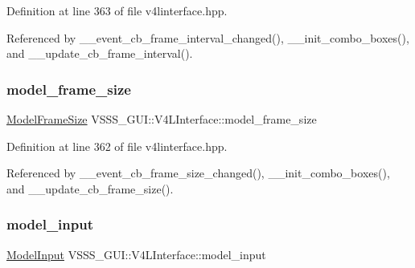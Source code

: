 Definition at line 363 of file v4linterface.\+hpp.



Referenced by \+\_\+\+\_\+event\+\_\+cb\+\_\+frame\+\_\+interval\+\_\+changed(), \+\_\+\+\_\+init\+\_\+combo\+\_\+boxes(), and \+\_\+\+\_\+update\+\_\+cb\+\_\+frame\+\_\+interval().

\mbox{\label{class_v_s_s_s___g_u_i_1_1_v4_l_interface_a04efec56b83f5abf62316fd79ee5ef22}} 
\subsubsection{\texorpdfstring{model\+\_\+frame\+\_\+size}{model\_frame\_size}}
{\footnotesize\ttfamily \hyperlink{class_v_s_s_s___g_u_i_1_1_v4_l_interface_adce6707a83ac1b5cd9dc7ee8b2929475}{Model\+Frame\+Size} V\+S\+S\+S\+\_\+\+G\+U\+I\+::\+V4\+L\+Interface\+::model\+\_\+frame\+\_\+size\hspace{0.3cm}{\ttfamily [private]}}



Definition at line 362 of file v4linterface.\+hpp.



Referenced by \+\_\+\+\_\+event\+\_\+cb\+\_\+frame\+\_\+size\+\_\+changed(), \+\_\+\+\_\+init\+\_\+combo\+\_\+boxes(), and \+\_\+\+\_\+update\+\_\+cb\+\_\+frame\+\_\+size().

\mbox{\label{class_v_s_s_s___g_u_i_1_1_v4_l_interface_ae8abf07c92a05ed82cadcabe7690e3fd}} 
\subsubsection{\texorpdfstring{model\+\_\+input}{model\_input}}
{\footnotesize\ttfamily \hyperlink{class_v_s_s_s___g_u_i_1_1_v4_l_interface_a1595c870c26f3848005f8211eeb67b18}{Model\+Input} V\+S\+S\+S\+\_\+\+G\+U\+I\+::\+V4\+L\+Interface\+::model\+\_\+input\hspace{0.3cm}{\ttfamily [private]}}




